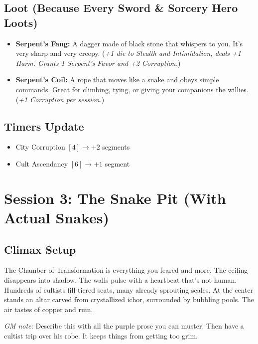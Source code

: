 \documentclass[11pt]{article}
\begin{document}
\subsection*{Loot (Because Every Sword & Sorcery Hero Loots)}
\begin{itemize}
    \item \textbf{Serpent's Fang:} A dagger made of black stone that whispers to you. It's very sharp and very creepy. (\textit{+1 die to Stealth and Intimidation, deals +1 Harm. Grants 1 Serpent's Favor and +2 Corruption.})
    \item \textbf{Serpent's Coil:} A rope that moves like a snake and obeys simple commands. Great for climbing, tying, or giving your companions the willies. (\textit{+1 Corruption per session.})
\end{itemize}

\subsection*{Timers Update}
\begin{itemize}
    \item City Corruption \([4] \to +2\) segments
    \item Cult Ascendancy \([6] \to +1\) segment
\end{itemize}

\section*{Session 3: The Snake Pit (With Actual Snakes)}

\subsection*{Climax Setup}
The Chamber of Transformation is everything you feared and more. The ceiling disappears into shadow. The walls pulse with a heartbeat that's not human. Hundreds of cultists fill tiered seats, many already sprouting scales. At the center stands an altar carved from crystallized ichor, surrounded by bubbling pools. The air tastes of copper and ruin.

\textit{GM note:} Describe this with all the purple prose you can muster. Then have a cultist trip over his robe. It keeps things from getting too grim.
\end{document}

